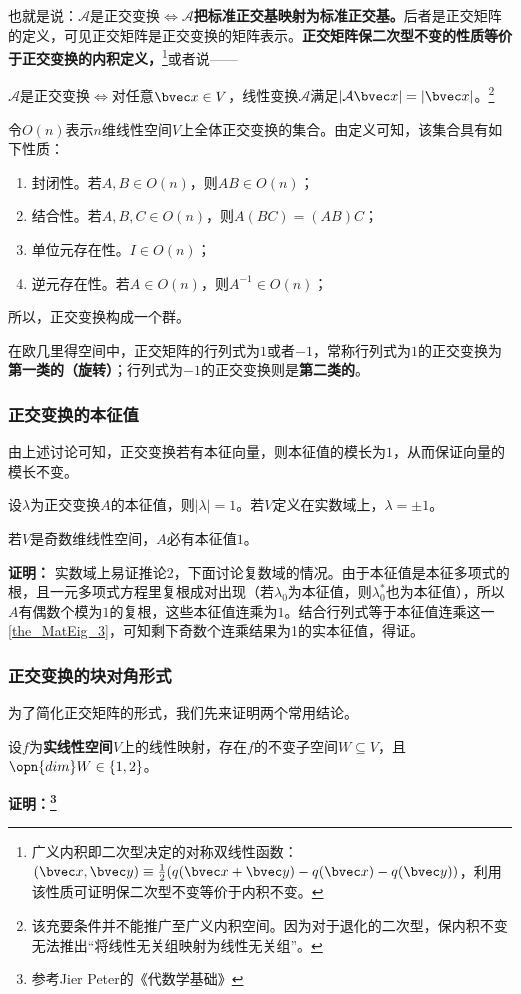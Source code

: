 也就是说：$\mathcal A$是正交变换$\Longleftrightarrow \mathcal A$\textbf{把标准正交基映射为标准正交基。}后者是正交矩阵的定义，可见正交矩阵是正交变换的矩阵表示。\textbf{正交矩阵保二次型不变的性质等价于正交变换的内积定义，}\footnote{广义内积即二次型决定的对称双线性函数：$(\bvec x,\bvec y)\equiv \frac{1}{2}(q(\bvec x+\bvec y)-q(\bvec x)-q(\bvec y))$，利用该性质可证明保二次型不变等价于内积不变。}或者说——

$\mathcal A$是正交变换$\Longleftrightarrow $对任意$\bvec x\in V$，线性变换$\mathcal A$满足$|\mathcal A\bvec x|=|\bvec x|$。\footnote{该充要条件并不能推广至广义内积空间。因为对于退化的二次型，保内积不变无法推出“将线性无关组映射为线性无关组”。}

令$O(n)$表示$n$维线性空间$V$上全体正交变换的集合。由定义可知，该集合具有如下性质：
\begin{enumerate}
\item 封闭性。若$A,B\in O(n)$，则$AB\in O(n)$；
\item 结合性。若$A,B,C\in O(n)$，则$A(BC)=(AB)C$；
\item 单位元存在性。$I\in O(n)$；
\item 逆元存在性。若$A\in O(n)$，则$A^{-1}\in O(n)$；
\end{enumerate}
所以，正交变换构成一个群。

在欧几里得空间中，正交矩阵的行列式为$1$或者$-1$，常称行列式为$1$的正交变换为\textbf{第一类的（旋转）}；行列式为$-1$的正交变换则是\textbf{第二类的}。
\subsubsection{正交变换的本征值}
由上述讨论可知，正交变换若有本征向量，则本征值的模长为$1$，从而保证向量的模长不变。
\begin{corollary}{}
 设$\lambda$为正交变换$A$的本征值，则$|\lambda|=1$。若$V$定义在实数域上，$\lambda=\pm 1$。
\end{corollary}
\begin{corollary}{}
若$V$是奇数维线性空间，$A$必有本征值$1$。
\end{corollary}
\textbf{证明：}
实数域上易证推论2，下面讨论复数域的情况。由于本征值是本征多项式的根，且一元多项式方程里复根成对出现（若$\lambda_0$为本征值，则$\lambda_0^{*}$也为本征值），所以$A$有偶数个模为$1$的复根，这些本征值连乘为$1$。结合行列式等于本征值连乘这一\autoref{the_MatEig_3}，可知剩下奇数个连乘结果为1的实本征值，得证。
\subsubsection{正交变换的块对角形式}
为了简化正交矩阵的形式，我们先来证明两个常用结论。
\begin{lemma}{}\label{lem_ortho_1}
设$f$为\textbf{实线性空间}$V$上的线性映射，存在$f$的不变子空间$W\subseteq V$，且$\opn{dim}W\in\{1,2\}$。
\end{lemma}
\textbf{证明：\footnote{参考Jier Peter的《代数学基础》}}

